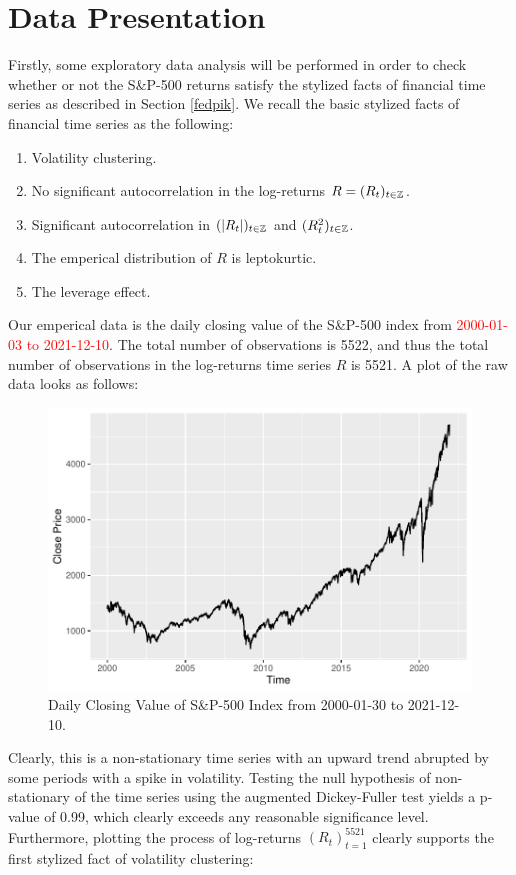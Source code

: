\section{Data Presentation}
Firstly, some exploratory data analysis will be performed in order to check whether or not the S\&P-500 returns satisfy the stylized facts of financial time series as described in Section \ref{fedpik}. We recall the basic stylized facts of financial time series as the following:
\begin{enumerate}
    \item Volatility clustering.
    \item No significant autocorrelation in the log-returns $R=(R_{t})_{t\in\mathbb{Z}}$.
    \item Significant autocorrelation in $(|R_{t}|)_{t\in \mathbb{Z}}$ and $(R_{t}^{2})_{t\in \mathbb{Z}}$.
    \item The emperical distribution of $R$ is leptokurtic. 
    \item The leverage effect.
\end{enumerate}
Our emperical data is the daily closing value of the S\&P-500 index from \textcolor{red}{2000-01-03 to 2021-12-10}. The total number of observations is 5522, and thus the total number of observations in the log-returns time series $R$ is 5521. A plot of the raw data looks as follows: 
\begin{figure}[H]
    \centering
    \includegraphics[scale=0.7]{fig/img/rawplotny.pdf}
    \caption{Daily Closing Value of S\&P-500 Index from 2000-01-30 to 2021-12-10.}
    \label{fig:rawplot}
\end{figure}
Clearly, this is a non-stationary time series with an upward trend abrupted by some periods with a spike in volatility. Testing the null hypothesis of non-stationary of the time series using the augmented Dickey-Fuller test yields a p-value of 0.99, which clearly exceeds any reasonable significance level. Furthermore, plotting the process of log-returns $(R_{t})_{t=1}^{5521}$ clearly supports the first stylized fact of volatility clustering: 
